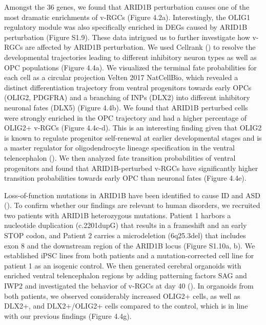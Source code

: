 Amongst the 36 genes, we found that ARID1B perturbation causes one of the most dramatic enrichments of v-RGCs (Figure 4.2a). Interestingly, the OLIG1 regulatory module was also specifically enriched in DEGs caused by ARID1B perturbation (Figure S1.9). These data intrigued us to further investigate how v-RGCs are affected by ARID1B perturbation. We used Cellrank (\cite{lange_cellrank_2022}) to resolve the developmental trajectories leading to different inhibitory neuron types as well as OPC populations (Figure 4.4a). We visualized the terminal fate probabilities for each cell as a circular projection {Velten 2017 NatCellBio}, which revealed a distinct differentiation trajectory from ventral progenitors towards early OPCs (OLIG2, PDGFRA) and a branching of INPs (DLX2) into different inhibitory neuronal fates (DLX5) (Figure 4.4b). We found that ARID1B perturbed cells were strongly enriched in the OPC trajectory and had a higher percentage of OLIG2+ v-RGCs (Figure 4.4c-d). This is an interesting finding given that OLIG2 is known to regulate progenitor self-renewal at earlier developmental stages and is a master regulator for oligodendrocyte lineage specification in the ventral telencephalon (\cite{petryniak_dlx1_2007,sun_phosphorylation_2011}). We then analyzed fate transition probabilities of ventral progenitors and found that ARID1B-perturbed v-RGCs have significantly higher transition probabilities towards early OPC than neuronal fates (Figure 4.4e).

Loss-of-function mutations in ARID1B have been identified to cause ID and ASD (\cite{moffat_neurobiology_2022,satterstrom_large-scale_2020}). To confirm whether our findings are relevant to human disorders, we recruited two patients with ARID1B heterozygous mutations. Patient 1 harbors a nucleotide duplication (c.2201dupG) that results in a frameshift and an early STOP codon, and Patient 2 carries a microdeletion (6q25.3del) that includes exon 8 and the downstream region of the ARID1B locus (Figure S1.10a, b). We established iPSC lines from both patients and a mutation-corrected cell line for patient 1 as an isogenic control. We then generated cerebral organoids with enriched ventral telencephalon regions by adding patterning factors SAG and IWP2 and investigated the behavior of v-RGCs at day 40 (\cite{bagley_fused_2017}). In organoids from both patients, we observed considerably increased OLIG2+ cells, as well as DLX2+, and DLX2+/OLIG2+ cells compared to the control, which is in line with our previous findings (Figure 4.4g). 

